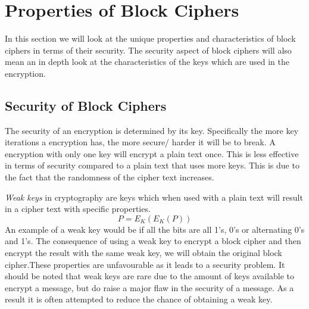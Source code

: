 \documentclass[11pt,a4paper, notitlepage]{report}
\begin{document}
\section{Properties of Block Ciphers}
\label{sec:CharpropBC}

In this section we will look at the unique properties and characteristics of block ciphers in terms of their security. The security aspect of block ciphers will also mean an in depth look at the characteristics of the keys which are used in the encryption. 

\subsection{Security of Block Ciphers}
\label{subsec:SecurityBC}

The security of an encryption is determined by its key. Specifically the more key iterations a encryption has, the more secure/ harder it will be to break. A encryption with only one key will encrypt a plain text once. This is less effective in terms of security compared to a plain text that uses more keys. This is due to the fact that the randomness of the cipher text increases.

\emph{Weak keys} in cryptography are keys which when used with a plain text will result in a cipher text with specific properties. 
\begin{displaymath}
P = E_{K}(E_{K}(P))
\end{displaymath}
An example of a weak key would be if all the bits are all 1's, 0's or alternating 0's and 1's. The consequence of using a weak key to encrypt a block cipher and then encrypt the result with the same weak key, we will obtain the original block cipher.These properties are unfavourable as it leads to a security problem. It should be noted that weak keys are rare due to the amount of keys available to encrypt a message, but do raise a major flaw in the security of a message. As a result it is often attempted to reduce the chance of obtaining a weak key.
\end{document}
